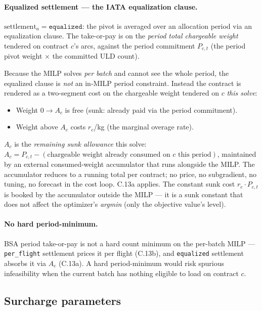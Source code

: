 \documentclass[11pt,a4paper]{article}
\theoremstyle{definition}
\begin{document}
\paragraph{Equalized settlement --- the IATA equalization clause.}
\label{sec:bsa-equalized-settlement}
$\text{settlement}_a = \texttt{equalized}$: the pivot is averaged over an
allocation period via an equalization clause. The take-or-pay is on the
\emph{period total chargeable weight} tendered on contract $c$'s arcs,
against the period commitment $P_{c,t}$ (the period pivot weight $\times$ the
committed ULD count).

Because the MILP solves \emph{per batch} and cannot see the whole period, the
equalized clause is \emph{not} an in-MILP period constraint. Instead the
contract is rendered as a two-segment cost on the chargeable weight tendered
on $c$ \emph{this solve}:
\begin{itemize}[noitemsep]
  \item Weight $0 \to A_c$ is free (sunk: already paid via the period
        commitment).
  \item Weight above $A_c$ costs $r_c$/kg (the marginal overage rate).
\end{itemize}
$A_c$ is the \emph{remaining sunk allowance} this solve: $A_c = P_{c,t} -
(\text{chargeable weight already consumed on $c$ this period})$, maintained
by an external consumed-weight accumulator that runs alongside the MILP. The
accumulator reduces to a running total per contract; no price, no
subgradient, no tuning, no forecast in the cost loop. C.13a applies. The
constant sunk cost $r_c \cdot P_{c,t}$ is booked by the accumulator outside
the MILP --- it is a sunk constant that does not affect the optimizer's
\emph{argmin} (only the objective value's level).

\paragraph{No hard period-minimum.}
BSA period take-or-pay is not a hard count minimum on the per-batch MILP ---
\texttt{per\_flight} settlement prices it per flight (C.13b), and
\texttt{equalized} settlement absorbs it via $A_c$ (C.13a). A hard
period-minimum would risk spurious infeasibility when the current batch has
nothing eligible to load on contract $c$.

\subsection{Surcharge parameters}
\label{sec:surcharge}
\end{document}
